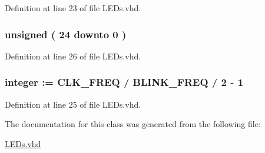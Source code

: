 Definition at line 23 of file L\+E\+Ds.\+vhd.

\hypertarget{class_l_e_ds_1_1_l_e_ds_a17db0b3b66ebd22d100f607c5589f41d}{}
\subsubsection[{cnt}]{ {\bfseries \textcolor{comment}{unsigned}\textcolor{vhdlchar}{ }\textcolor{vhdlchar}{(}\textcolor{vhdlchar}{ }\textcolor{vhdlchar}{ } \textcolor{vhdldigit}{24} \textcolor{vhdlchar}{ }\textcolor{keywordflow}{downto}\textcolor{vhdlchar}{ }\textcolor{vhdlchar}{ } \textcolor{vhdldigit}{0} \textcolor{vhdlchar}{ }\textcolor{vhdlchar}{)}\textcolor{vhdlchar}{ }} \hspace{0.3cm}{\ttfamily [Signal]}}\label{class_l_e_ds_1_1_l_e_ds_a17db0b3b66ebd22d100f607c5589f41d}


Definition at line 26 of file L\+E\+Ds.\+vhd.

\hypertarget{class_l_e_ds_1_1_l_e_ds_a62b6ca896e870c8bfbd7496a8c89efe6}{}
\subsubsection[{C\+N\+T\+\_\+\+M\+A\+X}]{ {\bfseries \textcolor{comment}{integer}\textcolor{vhdlchar}{ }\textcolor{vhdlchar}{ }\textcolor{vhdlchar}{\+:}\textcolor{vhdlchar}{=}\textcolor{vhdlchar}{ }\textcolor{vhdlchar}{ }\textcolor{vhdlchar}{ }\textcolor{vhdlchar}{ }{\bfseries {\bf C\+L\+K\+\_\+\+F\+R\+E\+Q}} \textcolor{vhdlchar}{/}\textcolor{vhdlchar}{ }\textcolor{vhdlchar}{ }\textcolor{vhdlchar}{ }{\bfseries {\bf B\+L\+I\+N\+K\+\_\+\+F\+R\+E\+Q}} \textcolor{vhdlchar}{/}\textcolor{vhdlchar}{ } \textcolor{vhdldigit}{2} \textcolor{vhdlchar}{-\/}\textcolor{vhdlchar}{ } \textcolor{vhdldigit}{1} \textcolor{vhdlchar}{ }} \hspace{0.3cm}{\ttfamily [Constant]}}\label{class_l_e_ds_1_1_l_e_ds_a62b6ca896e870c8bfbd7496a8c89efe6}


Definition at line 25 of file L\+E\+Ds.\+vhd.



The documentation for this class was generated from the following file\+:\begin{DoxyCompactItemize}
\item 
\hyperlink{_l_e_ds_8vhd}{L\+E\+Ds.\+vhd}\end{DoxyCompactItemize}
